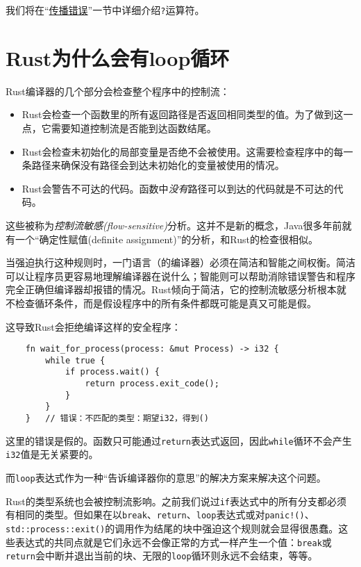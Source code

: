 我们将在“\hyperref[properror]{传播错误}”一节中详细介绍\texttt{?}运算符。

\section{Rust为什么会有loop循环}

Rust编译器的几个部分会检查整个程序中的控制流：
\begin{itemize}
    \item Rust会检查一个函数里的所有返回路径是否返回相同类型的值。为了做到这一点，它需要知道控制流是否能到达函数结尾。
    \item Rust会检查未初始化的局部变量是否绝不会被使用。这需要检查程序中的每一条路径来确保没有路径会到达未初始化的变量被使用的情况。
    \item Rust会警告不可达的代码。函数中\emph{没有}路径可以到达的代码就是不可达的代码。
\end{itemize}

这些被称为\emph{控制流敏感(flow-sensitive)}分析。这并不是新的概念，Java很多年前就有一个“确定性赋值(definite assignment)”的分析，和Rust的检查很相似。

当强迫执行这种规则时，一门语言（的编译器）必须在简洁和智能之间权衡。简洁可以让程序员更容易地理解编译器在说什么；智能则可以帮助消除错误警告和程序完全正确但编译器却报错的情况。Rust倾向于简洁，它的控制流敏感分析根本就不检查循环条件，而是假设程序中的所有条件都既可能是真又可能是假。

这导致Rust会拒绝编译这样的安全程序：
\begin{verbatim}
    fn wait_for_process(process: &mut Process) -> i32 {
        while true {
            if process.wait() {
                return process.exit_code();
            }
        }
    }   // 错误：不匹配的类型：期望i32，得到()
\end{verbatim}

这里的错误是假的。函数只可能通过\texttt{return}表达式返回，因此\texttt{while}循环不会产生\texttt{i32}值是无关紧要的。

而\texttt{loop}表达式作为一种“告诉编译器你的意思”的解决方案来解决这个问题。

Rust的类型系统也会被控制流影响。之前我们说过\texttt{if}表达式中的所有分支都必须有相同的类型。但如果在以\texttt{break}、\texttt{return}、\texttt{loop}表达式或对\texttt{panic!()}、\texttt{std::process::exit()}的调用作为结尾的块中强迫这个规则就会显得很愚蠢。这些表达式的共同点就是它们永远不会像正常的方式一样产生一个值：\texttt{break}或\texttt{return}会中断并退出当前的块、无限的\texttt{loop}循环则永远不会结束，等等。

